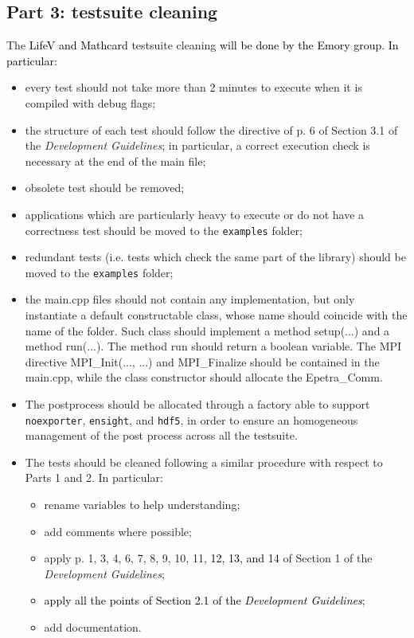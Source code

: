 \documentclass[10p]{article}
\newcommand{\newpartsVC}[1]{\textcolor{black}{#1}}
\theoremstyle{definition}
\begin{document}
\subsection*{Part 3: testsuite cleaning}
The \newpartsVC{LifeV and Mathcard} testsuite cleaning \newpartsVC{will be done by the Emory group. In particular:}
\begin{itemize}
\item every test should not take more than 2 minutes to execute when it is compiled with debug flags;
\item the structure of each test should follow the directive of p. 6 of Section 3.1 of the \emph{Development
	Guidelines}; in particular, a correct execution check is necessary at the end of the main file; 
\item obsolete test should be removed;
\item applications which are particularly heavy to execute or do not have a correctness test should be moved to the \texttt{examples} folder;
\item redundant tests (i.e. tests which check the same part of the library) should be moved to the \texttt{examples} folder;
\item the main.cpp files should not contain any implementation, but only instantiate a default constructable class, whose name should coincide with the name of the folder. Such class should implement a method setup(...) and a method run(...). The method run should return a boolean variable. The MPI directive MPI\_Init(..., ...) and MPI\_Finalize should be contained in the main.cpp, while the class constructor should allocate the Epetra\_Comm.
\item The postprocess should be allocated through a factory able to support \texttt{noexporter}, \texttt{ensight}, and \texttt{hdf5}, in order to ensure an homogeneous management of the post process across all the testsuite.
\item The tests should be cleaned following a similar procedure with respect to Parts 1 and 2. In particular:
\begin{itemize}
\item rename variables to help understanding;
\item add comments where possible;
\item apply p. 1, 3, 4, 6, 7, 8, 9, 10, 11, \newpartsVC{12, 13, and 14} of Section 1 of the \emph{Development Guidelines};
\item \newpartsVC{apply all the points of Section 2.1 of the \emph{Development Guidelines}}; 
\item add documentation.
\end{itemize}
\end{itemize}
\end{document}
